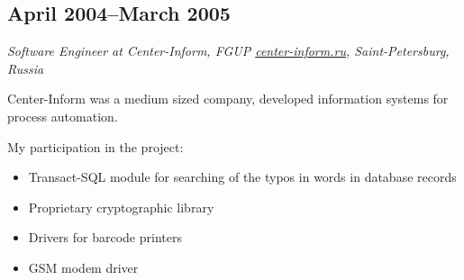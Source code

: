\subsection*{April 2004--March 2005}

\textit{Software Engineer at Center-Inform, FGUP
\href{http://center-inform.ru/}{\url{center-inform.ru}},
Saint-Petersburg, Russia}

Center-Inform was a medium sized company, developed information
systems for process automation.

My participation in the project:
\begin{itemize}[noitemsep, nosep]
  \item Transact-SQL module for searching of the typos in words in
database records
  \item Proprietary cryptographic library
  \item Drivers for barcode printers
  \item GSM modem driver
\end{itemize}
